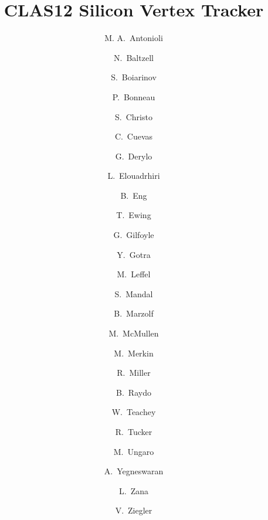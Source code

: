 \title{CLAS12 Silicon Vertex Tracker}

\author[A]{M. A.~Antonioli}
\author[A]{N.~Baltzell}
\author[A]{S.~Boiarinov}
\author[A]{P.~Bonneau}
\author[A]{S.~Christo}
\author[A]{C.~Cuevas}
\author[B]{G.~Derylo}
\author[A]{L.~Elouadrhiri}
\author[A]{B.~Eng}
\author[A]{T.~Ewing}
\author[C]{G.~Gilfoyle}
\author[A]{Y.~Gotra}
\author[A]{M.~Leffel}
\author[A]{S.~Mandal}
\author[A]{B.~Marzolf}
\author[A]{M.~McMullen}
\author[D]{M.~Merkin}
\author[A]{R.~Miller}
\author[A]{B.~Raydo}
\author[A]{W.~Teachey}
\author[E]{R.~Tucker}
\author[A]{M.~Ungaro}
\author[A]{A.~Yegneswaran}
\author[A]{L.~Zana}
\author[A]{V.~Ziegler}

\address[A]{Thomas Jefferson National Accelerator Facility, Newport News, VA, USA}
\address[B]{Fermi National Accelerator Laboratory, Batavia, IL, USA}
\address[C]{University of Richmond, Richmond, VA, USA}
\address[D]{Skobeltsyn Institute of Nuclear Physics, Moscow State University, Moscow, Russia}
\address[E]{Arizona State University, Tempe, AZ}

